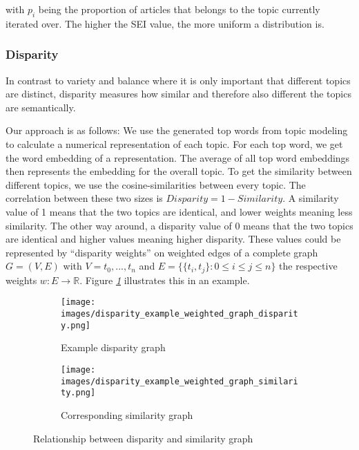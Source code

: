 with $p_i$ being the proportion of articles that belongs to the topic currently iterated over. The higher the SEI value, the more uniform a distribution is.


\subsubsection{Disparity} %
\label{subsec:methodology_data_set_diversity_disparity}

In contrast to variety and balance where it is only important that different topics are distinct, disparity measures how similar and therefore also different the topics are semantically. 

Our approach is as follows: We use the generated top words from topic modeling to calculate a numerical representation of each topic. For each top word, we get the word embedding of a representation. The average of all top word embeddings then represents the embedding for the overall topic. To get the similarity between different topics, we use the cosine-similarities between every topic. The correlation between these two sizes is $Disparity = 1 - Similarity$. A similarity value of 1 means that the two topics are identical, and lower weights meaning less similarity. The other way around, a disparity value of 0 means that the two topics are identical and higher values meaning higher disparity. 
These values could be represented by “disparity weights” on weighted edges of a complete graph $G = (V, E)$ with $V = t_0, ..., t_n$ and $E = \{\{t_i, t_j\}: 0 \leq i \leq j \leq n\}$ the respective weights $w: E \rightarrow \mathbb{R}$. Figure \textit{\ref{subfig:disparity_weighted_graph_disparity}} illustrates this in an example.


\begin{figure}[tb]
    \centering
    \begin{subfigure}{.3\textwidth}
        \centering
        \texttt{[image: images/disparity\_example\_weighted\_graph\_disparity.png]}
        \caption{Example disparity graph}
        \label{subfig:disparity_weighted_graph_disparity}
    \end{subfigure}
    \begin{subfigure}{.3\textwidth}
        \centering
        \texttt{[image: images/disparity\_example\_weighted\_graph\_similarity.png]}
        \caption{Corresponding similarity graph}
        \label{subfig:disparity_weighted_graph_similarity}
    \end{subfigure}
    \caption{Relationship between disparity and similarity graph}
    \label{fig:disparity_weighted_graph}
\end{figure}

